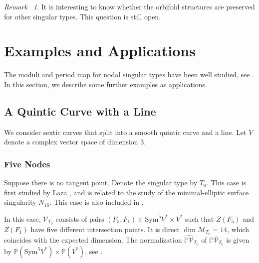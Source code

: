 \documentclass[12pt,reqno,a4paper]{amsart}
\theoremstyle{remark}
\newtheorem{rmk}[thm]{Remark~}
\theoremstyle{definition}
\begin{document}
\begin{rmk}
    It is interesting to know whether the orbifold structures are preserved for other singular types. This question is still open.
\end{rmk}











\section{Examples and Applications}
\label{sec: examples and applications}
The moduli and period map for nodal singular types have been well studied, see \cite{yu2023moduli}. 
In this section, we describe some further examples as applications. 

\subsection{A Quintic Curve with a Line}
We consider sextic curves that split into a smooth quintic curve and a line.
Let $V$ denote a complex vector space of dimension $3$.

\subsubsection{Five Nodes}
Suppose there is no tangent point. Denote the singular type by $T_0$. This case is first studied by Laza \cite{laza2009deformations}, and is related to the study of the minimal-elliptic surface singularity $N_{16}$.
This case is also included in \cite{yu2023moduli}.

In this case, $\mathcal{V}_{T_0}$ consists of pairs $(F_5,F_1)\in \mathrm{Sym}^5 V^*\times V^*$ such that $Z(F_5)$ and $Z(F_1)$ have five different intersection points.
It is direct $\dim \mathcal{M}_{T_0}=14$, which coincides with the expected dimension. The normalization $\widehat{\mathbb{P}\mathcal{V}}_{T_0}$ of $\mathbb{P}\overline{\mathcal{V}}_{T_0}$ is given by $\mathbb{P}(\mathrm{Sym}^5 V^*) \times \mathbb{P}(V^*)$, see \cite[\S 4.2]{yu2023moduli}.
\end{document}
